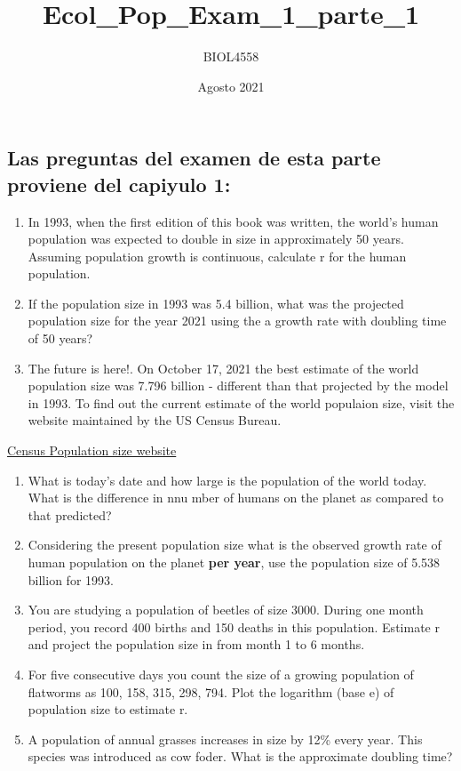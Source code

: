 \documentclass[
]{article}
\title{Ecol\_Pop\_Exam\_1\_parte\_1}
\author{BIOL4558}
\date{Agosto 2021}
\begin{document}
\maketitle

{
\setcounter{tocdepth}{2}
\tableofcontents
}
\hypertarget{las-preguntas-del-examen-de-esta-parte-proviene-del-capiyulo-1}{%
\subsection{Las preguntas del examen de esta parte proviene del capiyulo
1:}\label{las-preguntas-del-examen-de-esta-parte-proviene-del-capiyulo-1}}

\begin{enumerate}
\def\labelenumi{\arabic{enumi}.}
\item
  In 1993, when the first edition of this book was written, the world's
  human population was expected to double in size in approximately 50
  years. Assuming population growth is continuous, calculate r for the
  human population.
\item
  If the population size in 1993 was 5.4 billion, what was the projected
  population size for the year 2021 using the a growth rate with
  doubling time of 50 years?
\item
  The future is here!. On October 17, 2021 the best estimate of the
  world population size was 7.796 billion - different than that
  projected by the model in 1993. To find out the current estimate of
  the world populaion size, visit the website maintained by the US
  Census Bureau.
\end{enumerate}

\href{https://www.census.gov/popclock/}{Census Population size website}

\begin{enumerate}
\def\labelenumi{\arabic{enumi}.}
\setcounter{enumi}{3}
\item
  What is today's date and how large is the population of the world
  today. What is the difference in nnu mber of humans on the planet as
  compared to that predicted?
\item
  Considering the present population size what is the observed growth
  rate of human population on the planet \textbf{per year}, use the
  population size of 5.538 billion for 1993.
\item
  You are studying a population of beetles of size 3000. During one
  month period, you record 400 births and 150 deaths in this population.
  Estimate r and project the population size in from month 1 to 6
  months.
\item
  For five consecutive days you count the size of a growing population
  of flatworms as 100, 158, 315, 298, 794. Plot the logarithm (base e)
  of population size to estimate r.
\item
  A population of annual grasses increases in size by 12\% every year.
  This species was introduced as cow foder. What is the approximate
  doubling time?
\end{enumerate}
\end{document}
